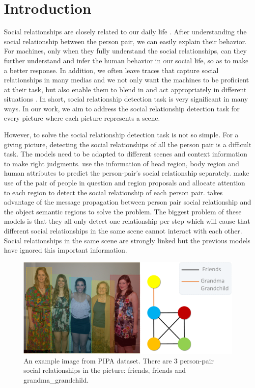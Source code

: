 \documentclass{article}
\begin{document}
\section{Introduction}
Social relationships are closely related to our daily life \cite{DBLP:conf/wacv/BarrCBF14}. After understanding the social relationship between the person pair, we can easily explain their behavior. For machines, only when they fully understand the social relationships, can they further understand and infer the human behavior in our social life, so as to make a better response. In addition, we often leave traces that capture social relationships in many medias and we not only want the machines to be proficient at their task, but also enable them to blend in and
act appropriately in different situations \cite{DBLP:conf/cvpr/SunSF17}. In short, social relationship detection task is very significant in many ways. In our work, we aim to address the social relationship detection task for every picture where each picture represents a scene. 

However, to solve the social relationship detection task is not so simple. For a giving picture, detecting the social relationships of all the person pair is a difficult task. The models need to be adapted to different scenes and context information to make right judgments.  \cite{DBLP:conf/cvpr/SunSF17} use the information of head region, body region and human attributes to predict the person-pair's social relationship separately. \cite{DBLP:conf/iccv/LiWZK17} make use of the pair of people in question and region proposals and allocate attention to each region to detect the social relationship of each person pair. \cite{DBLP:conf/ijcai/WangCRYCL18} takes advantage of the message propagation between person pair social relationship and the object  semantic regions to solve the problem. The biggest problem of these models is that they all only detect one relationship per step which will cause that different social relationships in the same scene cannot interact with each other. Social relationships in the same scene are strongly linked but the previous models have ignored this important information.

\vspace*{-3mm}
\begin{figure}[htpb]
	\centering
	\includegraphics[width=0.48 \textwidth,clip]{./pic/example.png}
	\caption{An example image from PIPA dataset. There are 3 person-pair social relationships in the picture: friends, friends and grandma\_grandchild.}
	\vspace*{-3.5mm}
	\label{example}
\end{figure}
\end{document}
